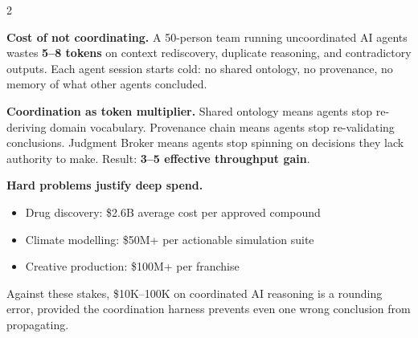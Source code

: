 \documentclass[10pt,a4paper]{article}
\begin{document}
\begin{multicols}{2}
\raggedright

{\small
\textbf{Cost of not coordinating.} A 50-person team running uncoordinated AI agents wastes \textbf{5--8\texttimes{} tokens} on context rediscovery, duplicate reasoning, and contradictory outputs. Each agent session starts cold: no shared ontology, no provenance, no memory of what other agents concluded.

\textbf{Coordination as token multiplier.} Shared ontology means agents stop re-deriving domain vocabulary. Provenance chain means agents stop re-validating conclusions. Judgment Broker means agents stop spinning on decisions they lack authority to make. Result: \textbf{3--5\texttimes{} effective throughput gain}.

\textbf{Hard problems justify deep spend.}
\begin{itemize}[leftmargin=8pt,itemsep=1pt,parsep=0pt,topsep=2pt,label={\color{cyan}\textbullet}]
  \item Drug discovery: \$2.6B average cost per approved compound
  \item Climate modelling: \$50M+ per actionable simulation suite
  \item Creative production: \$100M+ per franchise
\end{itemize}
Against these stakes, \$10K--100K on coordinated AI reasoning is a rounding error, provided the coordination harness prevents even one wrong conclusion from propagating.
}

\columnbreak

\begin{center}
\end{center}


\end{multicols}
\end{document}
